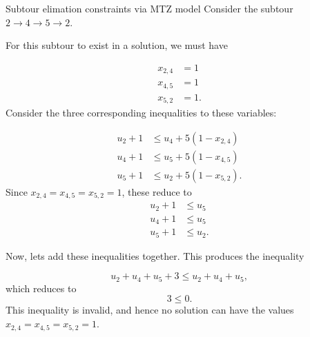 \begin{example}{Subtour elimation constraints via MTZ model}{}
Consider the subtour $2 \to 4 \to 5 \to 2$.   

For this subtour to exist in a solution, we must have

\begin{align*}
x_{2,4} &= 1\\
x_{4,5} &= 1\\
x_{5,2} &= 1.
\end{align*}
Consider the three corresponding inequalities to these variables:

\begin{align*}
u_{2} +1 &\leq  u_{4} + 5 (1-x_{2,4} )\\
u_{4} +1 &\leq  u_{5} + 5 (1-x_{4,5})\\
u_{5} +1 &\leq  u_{2} + 5 (1-x_{5,2} ).
\end{align*}
Since $x_{2,4} = x_{4,5} = x_{5,2} = 1$, these reduce to 
\begin{align*}
u_{2} +1 &\leq  u_{5} \\
u_{4} +1 &\leq  u_{5} \\
u_{5} +1 &\leq  u_{2} .
\end{align*}

Now, lets add these inequalities together.  This produces the inequality

$$
u_2 + u_4 + u_5 + 3 \leq u_2 + u_4 + u_5,
$$
which reduces to
$$
3 \leq 0.
$$
This inequality is invalid, and hence no solution can have the values $x_{2,4} = x_{4,5} = x_{5,2} = 1$.
\end{example}


